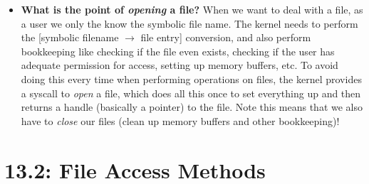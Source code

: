 \documentclass[12pt]{article}
\begin{document}
\begin{itemize}
    \item \textbf{What is the point of \textit{opening} a file?} When we want to deal with a file, as a user we only the know the symbolic file name. The kernel needs to perform the [symbolic filename \(\rightarrow\) file entry] conversion, and also perform bookkeeping like checking if the file even exists, checking if the user has adequate permission for access, setting up memory buffers, etc. To avoid doing this every time when performing operations on files, the kernel provides a syscall to \textit{open} a file, which does all this once to set everything up and then returns a handle (basically a pointer) to the file. Note this means that we also have to \textit{close} our files (clean up memory buffers and other bookkeeping)!
\end{itemize}

\section*{13.2: File Access Methods}
\end{document}
